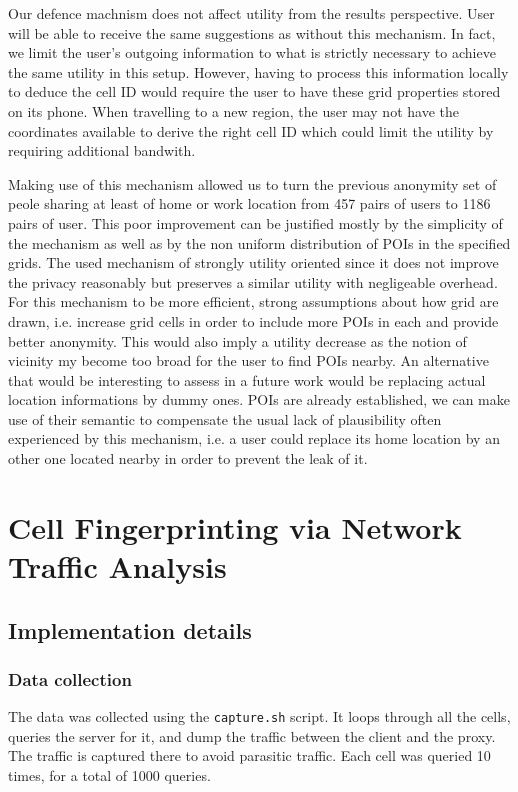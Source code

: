 \documentclass[10pt,conference,compsocconf]{IEEEtran}
\begin{document}
Our defence machnism does not affect utility from the results perspective. User will be able to receive the same suggestions as without this mechanism. In fact, we limit the user's outgoing information to what is strictly necessary to achieve the same utility in this setup. However, having to process this information locally to deduce the cell ID would require the user to have these grid properties stored on its phone. When travelling to a new region, the user may not have the coordinates available to derive the right cell ID which could limit the utility by requiring additional bandwith.

Making use of this mechanism allowed us to turn the previous anonymity set of peole sharing at least of home or work location from 457 pairs of users to 1186 pairs of user. This poor improvement can be justified mostly by the simplicity of the mechanism as well as by the non uniform distribution of POIs in the specified grids. The used mechanism of strongly utility oriented since it does not improve the privacy reasonably but preserves a similar utility with negligeable overhead. For this mechanism to be more efficient, strong assumptions about how grid are drawn, i.e. increase grid cells in order to include more POIs in each and provide better anonymity. This would also imply a utility decrease as the notion of vicinity my become too broad for the user to find POIs nearby. An alternative that would be interesting to assess in a future work would be replacing actual location informations by dummy ones. POIs are already established, we can make use of their semantic to compensate the usual lack of plausibility often experienced by this mechanism, i.e. a user could replace its home location by an other one located nearby in order to prevent the leak of it.

\section{Cell Fingerprinting via Network Traffic Analysis}

\subsection{Implementation details}
\subsubsection{Data collection}
The data was collected using the \verb|capture.sh| script. It loops through all the cells, queries the server for it, and dump the traffic between the client and the proxy. The traffic is captured there to avoid parasitic traffic. Each cell was queried 10 times, for a total of 1000 queries.
\end{document}
